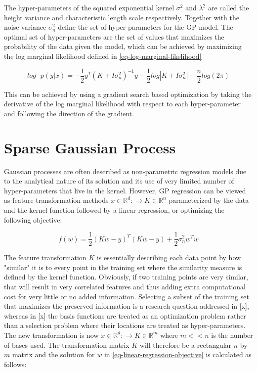 \documentclass[useAMS,usenatbib,fleqn]{mn2e}
\begin{document}
The hyper-parameters of the squared exponential kernel $\sigma^{2}$ and $\lambda^{2}$ are called the height variance and characteristic length scale respectively. Together with the noise variance $\sigma_{n}^{2}$ define the set of hyper-parameters for the GP model. The optimal set of hyper-parameters are the set of values that maximizes the probability of the data given the model, which can be achieved by maximizing the log marginal likelihood defined in \eqref{eq-log-marginal-likelihood} 

\begin{equation}
\label{eq-log-marginal-likelihood}
log\text{ }p(y|x) = -\frac{1}{2}y^{T}\left(K+I\sigma_{n}^{2} \right)^{-1}y-\frac{1}{2}log\left | K+I\sigma_{n}^{2}\right|-\frac{n}{2}log(2\pi)
\end{equation}

This can be achieved by using a gradient search based optimization by taking the derivative of the log marginal likelihood with respect to each hyper-parameter and following the direction of the gradient.

\section{Sparse Gaussian Process}
\label{sec-sparse-gaussian-process}
Gaussian processes are often described as non-parametric regression models due to the analytical nature of its solution and its use of very limited number of hyper-parameters that live in the kernel. However, GP regression can be viewed as feature transformation methods $x\in \mathbb{R}^{d}:\rightarrow K\in \mathbb{R}^{n}$ parameterized by the data and the kernel function followed by a linear regression, or optimizing the following objective:

\begin{equation}
\label{eq-linear-regression-objective}
f(w)=\frac{1}{2}\left ( Kw-y \right )^{T} \left( Kw-y \right )+\frac{1}{2}\sigma_{n}^{2}w^{T}w
\end{equation}

The feature transformation $K$ is essentially describing each data point by how "similar" it is to every point in the training set where the similarity measure is defined by the kernel function. Obviously, if two training points are very similar, that will result in very correlated features and thus adding extra computational cost for very little or no added information. Selecting a subset of the training set that maximizes the preserved information is a research question addressed in [x], whereas in [x] the basis functions are treated as an optimization problem rather than a selection problem where their locations are treated as hyper-parameters. The new transformation is now $x\in \mathbb{R}^{d}:\rightarrow K\in \mathbb{R}^{m}$ where $m<<n$ is the number of bases used. The transformation matrix $K$ will therefore be a rectangular $n$ by $m$ matrix and the solution for $w$ in \eqref{eq-linear-regression-objective} is calculated as follows:
\end{document}
